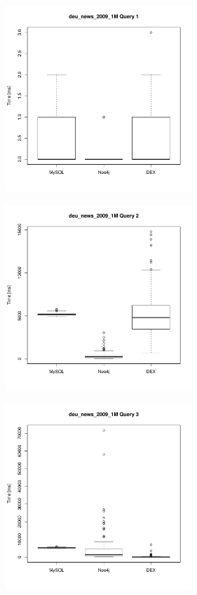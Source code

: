 \documentclass[11pt, a4paper, oneside]{article} %
\begin{document}
\begin{appendix}
\begin{landscape} 
	\newpage
	\thispagestyle{empty}
	
	\begin{figure}[ht]
		\begin{minipage}[hbt]{6.5cm}
			\centering
			\includegraphics[width=7cm]{../results/cold caches/images/1M_query1_boxplot}
			\label{fig:1M_query1_boxplot}
		\end{minipage}
		\hfill
		\begin{minipage}[hbt]{6.5cm}
			\centering
			\includegraphics[width=7cm]{../results/cold caches/images/1M_query2_boxplot}
			\label{fig:1M_query2_boxplot}
		\end{minipage}
		\hfill
		\begin{minipage}[hbt]{6.5cm}
			\centering
			\includegraphics[width=7cm]{../results/cold caches/images/1M_query3_boxplot}
			\label{fig:1M_query3_boxplot}
		\end{minipage}
		

\end{figure}
\end{landscape}
\end{appendix}
\end{document}
